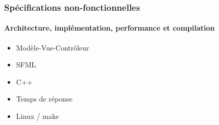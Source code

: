 \begin{frame}

	\frametitle{Spécifications non-fonctionnelles}
	\framesubtitle{Architecture, implémentation, performance et compilation}
	
	\begin{itemize}
		\item Modèle-Vue-Contrôleur
	\end{itemize}
	\begin{itemize}
		\item SFML
	\end{itemize}
	\begin{itemize}
		\item C++
	\end{itemize}
	\begin{itemize}
		\item Temps de réponse
	\end{itemize}
	\begin{itemize}
		\item Linux / make
	\end{itemize}
	
\end{frame}
